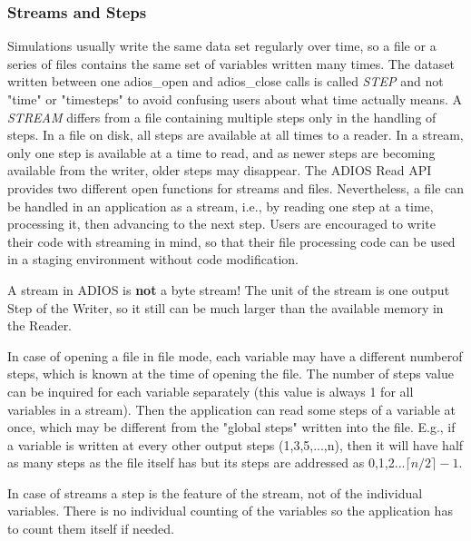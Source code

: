 \subsubsection{Streams and Steps}
Simulations usually write the same data set regularly over time, so a file or a series of files contains the same set of variables written many times. The dataset written between one adios\_open and adios\_close calls is called {\em STEP} and not "time" or "timesteps" to avoid confusing users about what time actually means. A {\em STREAM} differs from a file containing multiple steps only in the handling of steps. In a file on disk, all steps are available at all times to a reader. In a stream, only one step is available at a time to read, and as newer steps are becoming available from the writer, older steps may disappear. The ADIOS Read API provides two different open functions for streams and files. Nevertheless, a file can be handled in an application as a stream, i.e., by reading one step at a time, processing it, then advancing to the next step. Users are encouraged to write their code with streaming in mind, so that their file processing code can be used in a staging environment without code modification. 

\vspace{6pt}
 A stream in ADIOS is {\bf not} a byte stream! The unit of the stream is one output Step of the Writer, so it still can be much larger than the available memory in the Reader.
\vspace{6pt}

In case of opening a file in file mode, each variable may have a different numberof steps, which is known at the time of opening the file. The number of steps value can be inquired for each variable separately (this value is always 1 for all variables in a stream). Then the application can read some steps of a variable at once, which may be different from the "global steps" written into the file. E.g., if a variable is written at every other output steps (1,3,5,...,n), then it will have half as many steps as the file itself has but its steps are addressed as 0,1,2...$\lceil n/2\rceil-1$.

In case of streams a step is the feature of the stream, not of the individual variables. There is no individual counting of the variables so the application has to count them itself if needed. 


